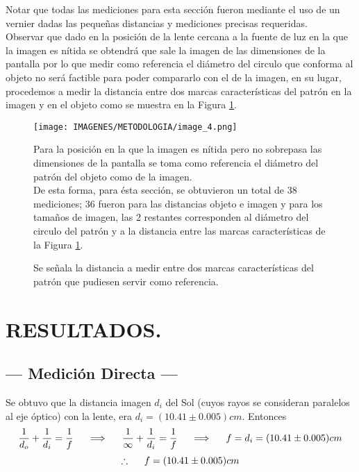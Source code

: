 \documentclass[10pt,a4paper]{article}
\begin{document}
\newpage
Notar que todas las mediciones para esta sección fueron mediante el uso de un vernier dadas las pequeñas distancias y mediciones precisas requeridas. \\[2mm]
Observar que dado en la posición de la lente cercana a la fuente de luz en la que la imagen es nítida se obtendrá que sale la imagen de las dimensiones de la pantalla por lo que medir como referencia el diámetro del circulo que conforma al objeto no será factible para poder compararlo con el de la imagen, en su lugar, procedemos a medir la distancia entre dos marcas características del patrón en la imagen y en el objeto como se muestra en la Figura \ref{fig:ima_4}.
\begin{figure}[ht]
	\begin{minipage}{0.55\linewidth}
		\centering
		\texttt{[image: IMAGENES/METODOLOGIA/image\_4.png]}
		\caption{Se señala la distancia a medir entre dos marcas características del patrón que pudiesen servir como referencia.}
		\label{fig:ima_4}
	\end{minipage}
	\begin{minipage}{0.45\linewidth}
		Para la posición en la que la imagen es nítida pero no sobrepasa las dimensiones de la pantalla se toma como referencia el diámetro del patrón del objeto como de la imagen. \\[1cm]
		De esta forma, para ésta sección, se obtuvieron un total de 38 mediciones; 36 fueron para las distancias objeto e imagen y para los tamaños de imagen, las 2 restantes corresponden al diámetro del circulo del patrón y a la distancia entre las marcas características de la Figura \ref{fig:ima_4}.
	\end{minipage} 
\end{figure}
\vspace{-5mm}

\section{RESULTADOS.} %

\subsection{--- Medición Directa ---} %
\label{sub:parte_1}
Se obtuvo que la distancia imagen $d_i$ del Sol (cuyos rayos se consideran paralelos al eje óptico) con la lente, era $d_i=(10.41\pm0.005)cm$. Entonces \vspace{-3mm}
$$\dfrac{1}{d_o}+\dfrac{1}{d_i}=\dfrac{1}{f} \hspace{5mm} \Longrightarrow \hspace{5mm}\dfrac{1}{\infty}+\dfrac{1}{d_i}=\dfrac{1}{f} \hspace{5mm} \Longrightarrow \hspace{5mm}  f=d_i=(10.41\pm0.005) cm $$
$$\therefore \hspace{5mm} f=(10.41\pm0.005) cm$$
\end{document}
